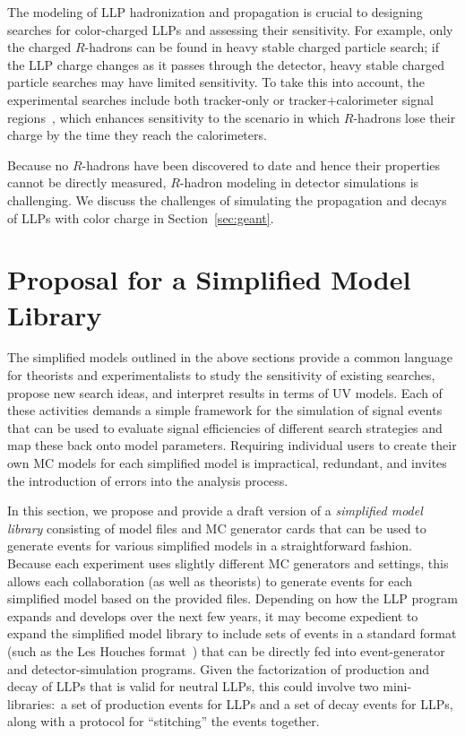 The modeling of LLP hadronization and propagation is crucial to designing searches for color-charged LLPs and assessing their sensitivity. For example,  only the charged $R$-hadrons can be found in heavy stable charged particle search; if the LLP charge changes as it passes through the detector, heavy stable charged particle searches may have limited sensitivity. To take this into account, the experimental searches  include both tracker-only or tracker$+$calorimeter signal regions~\cite{CMS-PAS-EXO-16-036,Aaboud:2019trc}, which enhances sensitivity to the scenario in which $R$-hadrons lose their charge by the time they reach the calorimeters. 

Because no $R$-hadrons have been discovered to date and hence their properties cannot be directly measured, $R$-hadron modeling in detector simulations is challenging. We discuss  the challenges of simulating the propagation and decays of  LLPs with color charge in Section~\ref{sec:geant}.






\section{Proposal for a Simplified Model Library}\label{sec:library}

The simplified models outlined in the above sections provide a common language for theorists and experimentalists to study the sensitivity of existing searches, propose new search ideas, and interpret results in terms of UV models.
Each of these activities demands a simple framework for the simulation of signal events that can be used to evaluate signal efficiencies of different search strategies and map these back onto model parameters.
Requiring individual users to create their own MC models for each simplified model is impractical, redundant, and invites the introduction of errors into the analysis process.

In this section, we propose and provide a draft version of a \emph{simplified model library} consisting of model files and MC generator cards that can be used to generate events for various simplified models in a straightforward fashion.
Because each experiment uses slightly different MC generators and settings, this allows each collaboration (as well as theorists) to generate events for each simplified model based on the provided files.
Depending on how the LLP program expands and develops over the next few years, it may become expedient to expand the simplified model library to include sets of events in a standard format (such as the Les Houches format~\cite{Alwall:2006yp}) that can be directly fed into event-generator and detector-simulation programs.
Given the factorization of production and decay of LLPs that is valid for neutral LLPs, this could involve two mini-libraries:~a set of production events for LLPs and a set of decay events for LLPs, along with a protocol for ``stitching'' the events together.


